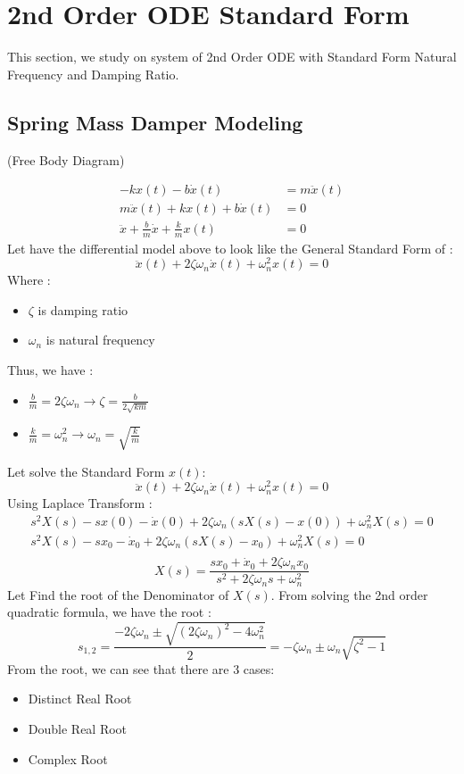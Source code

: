 \chapter{2nd Order ODE Standard Form}
This section, we study on system of 2nd Order ODE with Standard Form Natural Frequency and Damping Ratio.
\section{Spring Mass Damper Modeling}
(Free Body Diagram)

\[
\begin{split}
	-kx(t) - b\dot{x}(t) &= m\ddot{x}(t) \\
	m\ddot{x}(t) + kx(t) + b\dot{x}(t)&= 0 \\
	\ddot{x} + \frac{b}{m} \dot{x}+\frac{k}{m} x(t) &= 0
\end{split}
\]
Let have the differential model above to look like the General Standard Form of :
\[
\boxed{\ddot{x}(t)+2\zeta\omega_n\dot{x}(t)+\omega_n^2x(t)=0}
\]
Where :
\begin{itemize}
	\item $ \zeta $ is damping ratio
	\item $ \omega_n $ is natural frequency
\end{itemize}
Thus, we have :
\begin{itemize}
	\item $ \frac{b}{m} = 2\zeta\omega_n \rightarrow \zeta = \frac{b}{2\sqrt{km}}$ 
	\item $ \frac{k}{m} = \omega_n^2 \rightarrow \omega_n = \sqrt{\frac{k}{m}}$
\end{itemize}
Let solve the Standard Form $ x(t) $:
\[ 
\ddot{x}(t)+2\zeta\omega_n\dot{x}(t)+\omega_n^2x(t)=0 
\]
Using Laplace Transform :
\[ 
\begin{split}
	s^2 X(s) - sx(0) -  \dot{x}(0) + 2\zeta\omega_n(sX(s)-x(0)) + \omega_n^2X(s) = 0 \\
	s^2 X(s) - sx_0 -  \dot{x}_0 + 2\zeta\omega_n(sX(s)-x_0) + \omega_n^2X(s) = 0 \\
\end{split}
\]
\[ 
X(s) = \frac{sx_0 + \dot{x}_0 + 2\zeta\omega_nx_0}{s^2 + 2\zeta\omega_ns+\omega_n^2}
\]
Let Find the root of the Denominator of $ X(s) $. From solving the 2nd order quadratic formula, we have the root :
\[ 
s_{1,2} = \frac{-2\zeta\omega_n \pm \sqrt{(2\zeta\omega_n)^2 - 4\omega_n^2}}{2} = -\zeta\omega_n \pm \omega_n\sqrt{\zeta^2-1}
\]
From the root, we can see that there are 3 cases:
\begin{itemize}
	\item Distinct Real Root
	\item Double Real Root
	\item Complex Root
\end{itemize}


